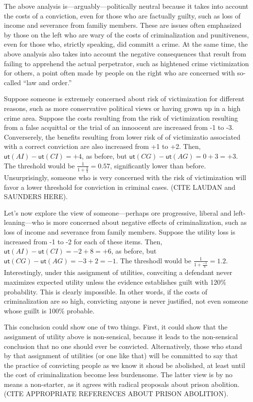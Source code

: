 \documentclass[
  10pt,
  dvipsnames,enabledeprecatedfontcommands]{scrartcl}
\newcommand{\ut}{\mathsf{ut}}
\begin{document}
The above analysis is---arguably---politically neutral because it takes
into account the costs of a conviction, even for those who are factually
guilty, such as loss of income and severance from familiy members. These
are issues often emphasized by those on the left who are wary of the
costs of criminalization and punitiveness, even for those who, strictly
speaking, did committ a crime. At the same time, the above analysis also
takes into account the negative consequences that result from failing to
apprehend the actual perpetrator, such as hightened crime victimization
for others, a point often made by people on the right who are concerned
with so-called ``law and order.''

Suppose someone is extremely concerned about risk of victimization for
different reasons, such as more conservative political views or having
grown up in a high crime area. Suppose the costs resulting from the risk
of victimization resulting from a false acquittal or the trial of an
innoocent are increased from -1 to -3. Converserely, the benefits
resulting from lower risk of of victimizatio associated with a correct
conviction are also increased from +1 to +2. Then,
\(\ut(AI)-\ut(CI)=+4\), as before, but \(\ut(CG)-\ut(AG)=0+3=+3\). The
threshold would be \(\frac{1}{1+\frac{3}{4}}=0.57\), significantly lower
than before. Unsurprisingly, someone who is very concerned with the risk
of victimization will favor a lower threshold for conviction in criminal
cases. (CITE LAUDAN and SAUNDERS HERE).

Let's now explore the view of someone---perhaps ore progressive, liberal
and left-leaning---who is more concerned about negative effects of
criminalization, such as loss of income and severance from family
members. Suppose the utility loss is increased from -1 to -2 for each of
these items. Then, \(\ut(AI)-\ut(CI)=-2+8=+6\), as before, but
\(\ut(CG)-\ut(AG)=-3+2=-1\). The threshodl would be
\(\frac{1}{1+\frac{-1}{6}}=1.2\). Interestingly, under this assignment
of utilities, convciting a defendant never maximizes expected utility
unless the evidence establishes guilt with 120\% probability. This is
clearly impossible. In other words, if the costs of criminalization are
so high, convicting anyone is never justified, not even someone whose
guillt is 100\% probable.

This conclusion could show one of two things. First, it could show that
the assignment of utility above is non-sensical, because it leads to the
non-sensical conclusion that no one should ever be convicted.
Alternatively, those who stand by that assignment of utilities (or one
like that) will be committed to say that the practice of convicting
people as we know it shoud be abolished, at least until the cost of
criminalization become less burdensome. The latter view is by no means a
non-starter, as it agrees with radical proposals about prison abolition.
(CITE APPROPRIATE REFERENCES ABOUT PRISON ABOLITION).
\end{document}
